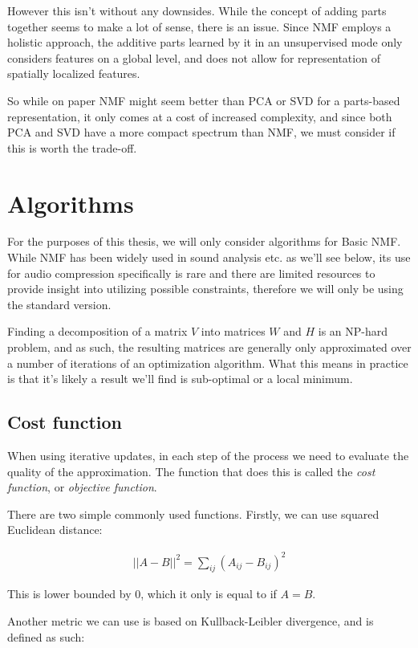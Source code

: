 However this isn't without any downsides. While the concept of adding parts together seems to make a lot of sense, there is an issue. Since NMF employs a holistic approach, the additive parts learned by it in an unsupervised mode only considers features on a global level, and does not allow for representation of spatially localized features. \cite{li_spatial_lnmf_2001}

So while on paper NMF might seem better than PCA or SVD for a parts-based representation, it only comes at a cost of increased complexity, and since both PCA and SVD have a more compact spectrum than NMF, we must consider if this is worth the trade-off. \cite{wang_zhang_2013}

\section{Algorithms}
For the purposes of this thesis, we will only consider algorithms for Basic NMF. While NMF has been widely used in sound analysis etc. as we'll see below, its use for audio compression specifically is rare and there are limited resources to provide insight into utilizing possible constraints, therefore we will only be using the standard version.

Finding a decomposition of a matrix $V$ into matrices $W$ and $H$ is an NP-hard problem, and as such, the resulting matrices are generally only approximated over a number of iterations of an optimization algorithm. What this means in practice is that it's likely a result we'll find is sub-optimal or a local minimum.

\subsection{Cost function}
When using iterative updates, in each step of the process we need to evaluate the quality of the approximation. The function that does this is called the \emph{cost function}, or \emph{objective function}.

There are two simple commonly used functions. Firstly, we can use squared Euclidean distance: \cite{pentti_pmf_1997}

\begin{align}
\label{equ:cost_euc}
||A-B||^2 = \sum_{ij}(A_{ij} - B_{ij})^2
\end{align}

This is lower bounded by 0, which it only is equal to if $A = B$.

Another metric we can use is based on Kullback-Leibler divergence, and is defined as such: \cite{nmf_algorithms}

